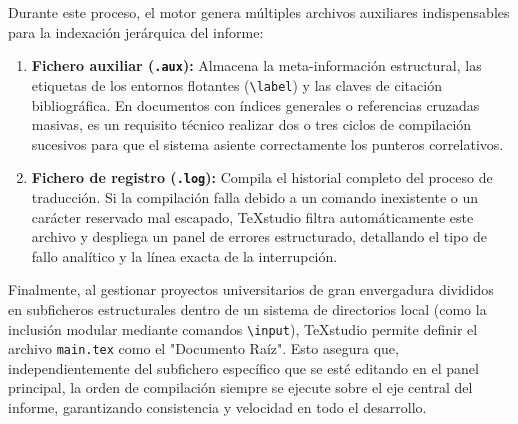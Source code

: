 Durante este proceso, el motor genera múltiples archivos auxiliares indispensables para la indexación jerárquica del informe:
\begin{enumerate}
    \item \textbf{Fichero auxiliar (\texttt{.aux}):} Almacena la meta-información estructural, las etiquetas de los entornos flotantes (\texttt{\textbackslash label}) y las claves de citación bibliográfica. En documentos con índices generales o referencias cruzadas masivas, es un requisito técnico realizar dos o tres ciclos de compilación sucesivos para que el sistema asiente correctamente los punteros correlativos.
    \item \textbf{Fichero de registro (\texttt{.log}):} Compila el historial completo del proceso de traducción. Si la compilación falla debido a un comando inexistente o un carácter reservado mal escapado, TeXstudio filtra automáticamente este archivo y despliega un panel de errores estructurado, detallando el tipo de fallo analítico y la línea exacta de la interrupción.
\end{enumerate}

Finalmente, al gestionar proyectos universitarios de gran envergadura divididos en subficheros estructurales dentro de un sistema de directorios local (como la inclusión modular mediante comandos \texttt{\textbackslash input}), TeXstudio permite definir el archivo \texttt{main.tex} como el "Documento Raíz". Esto asegura que, independientemente del subfichero específico que se esté editando en el panel principal, la orden de compilación siempre se ejecute sobre el eje central del informe, garantizando consistencia y velocidad en todo el desarrollo.